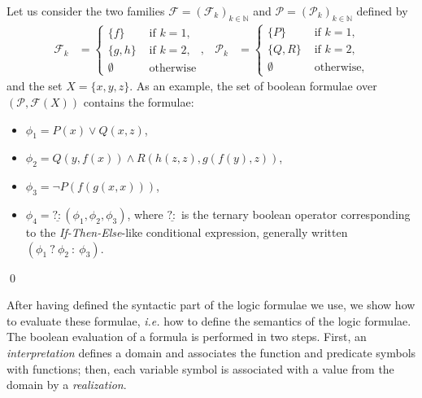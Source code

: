 \documentclass[a4paper]{llncs}
\begin{document}
  \begin{example}\label{ex formule bool}
    Let us consider the two families $\mathcal{F}=(\mathcal{F}_k)_{k\in\mathbb{N}}$ and $\mathcal{P}=(\mathcal{P}_k)_{k\in\mathbb{N}}$ defined by
  \begin{align*}
        \mathcal{F}_k&=
          \begin{cases}
            \{f\} & \text{ if }k=1,\\
            \{g,h\} & \text{ if }k=2,\\
            \emptyset & \text{ otherwise}
          \end{cases},&
        \mathcal{P}_k&=
          \begin{cases}
            \{P\} & \text{ if }k=1,\\
            \{Q,R\} & \text{ if }k=2,\\
            \emptyset & \text{ otherwise,}
          \end{cases}
  \end{align*}
  and the set $X=\{x,y,z\}$.        
        As an example, the set of boolean formulae over $(\mathcal{P},\mathcal{F}(X))$ contains the formulae:
    \begin{itemize}
      \item $\phi_1=P(x) \vee Q(x,z)$,
      \item $\phi_2=Q(y,f(x)) \wedge R(h(z,z),g(f(y),z))$,
      \item $\phi_3=\neg P(f(g(x,x)))$,
      \item $\phi_4=\underline{?:} (\phi_1,\phi_2,\phi_3)$, where $\underline{?:}$ is the ternary  boolean operator corresponding to the \emph{If-Then-Else}-like conditional expression, generally written $(\phi_1\ ?\ \phi_2\ :\ \phi_3)$.
    \end{itemize}
    \qed
  \end{example}
  
  After having defined the syntactic part of the logic formulae we use, we show how to evaluate these formulae, \emph{i.e.} how to define the semantics of the logic formulae. The boolean evaluation of a formula is performed in two steps. First, an \emph{interpretation} defines a domain and associates the function and predicate symbols with functions; then, each variable symbol is associated with a value from the domain by a \emph{realization}. 
  
\end{document}
